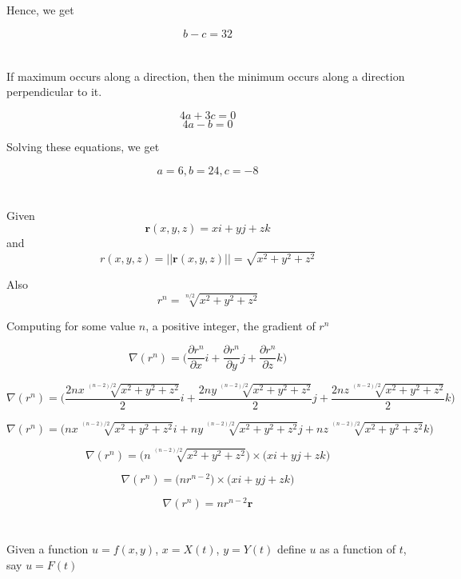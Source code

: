 \documentclass[11pt]{article}
\begin{document}
Hence, we get 

$$b - c = 32$$
\\
\\
If maximum occurs along a direction, then the minimum occurs along a direction perpendicular to it.

$$4a + 3c = 0$$
$$4a - b = 0$$

Solving these equations, we get

$$a = 6, b = 24, c = -8$$



\section{}

Given 
$$\textbf{r}(x,y,z) = xi + yj + zk$$ and $$r(x,y,z) = ||\textbf{r}(x,y,z)|| = \sqrt{x^{2} + y^{2} + z^{2}}$$

Also 
$$r^{n} = \sqrt[n/2]{x^{2} + y^{2} + z^{2}}$$

Computing for some value $n$, a positive integer, the gradient of $r^{n}$

$$ \nabla(r^{n}) = \Big(\frac{\partial r^{n}}{\partial x}i + \frac{\partial r^{n}}{\partial y}j + \frac{\partial r^{n}}{\partial z}k\Big)$$

$$\nabla(r^{n}) = \Big(\frac{2nx\sqrt[(n-2)/2]{x^{2} + y^{2} + z^{2}}}{2}i + \frac{2ny\sqrt[(n-2)/2]{x^{2} + y^{2} + z^{2}}}{2}j + \frac{2nz\sqrt[(n-2)/2]{x^{2} + y^{2} + z^{2}}}{2}k\Big)$$

$$\nabla(r^{n}) = \Big(nx\sqrt[(n-2)/2]{x^{2} + y^{2} + z^{2}}i + ny\sqrt[(n-2)/2]{x^{2} + y^{2} + z^{2}}j + nz\sqrt[(n-2)/2]{x^{2} + y^{2} + z^{2}}k\Big)$$

$$\nabla(r^{n}) = \Big(n\sqrt[(n-2)/2]{x^{2} + y^{2} + z^{2}}\Big)\times\Big(xi + yj + zk\Big)$$

$$\nabla(r^{n}) = \Big(nr^{n-2}\Big)\times\Big(xi + yj + zk\Big)$$

$$\nabla(r^{n}) = nr^{n-2}\textbf{r}$$

\section{}

Given a function $u = f(x,y)$, $x = X(t)$, $y = Y(t)$ define $u$ as a function of $t$, say $u = F(t)$

\subsection{}
\end{document}
